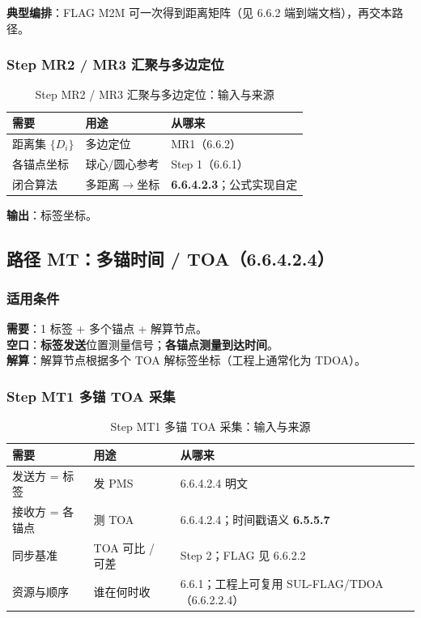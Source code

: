 \documentclass[11pt,a4paper]{ctexart}
\begin{document}
\textbf{典型编排}：FLAG M2M 可一次得到距离矩阵（见 6.6.2 端到端文档），再交本路径。

\subsubsection{Step MR2 / MR3 汇聚与多边定位}

\begin{longtable}{L{3.4cm}L{4.8cm}L{4.8cm}}
\caption{Step MR2 / MR3 汇聚与多边定位：输入与来源\label{tab:step134}} \\
\toprule
\textbf{需要} & \textbf{用途} & \textbf{从哪来} \\
\midrule
距离集 $\{D_i\}$ & 多边定位 & MR1（6.6.2） \\
各锚点坐标 & 球心/圆心参考 & Step 1（6.6.1） \\
闭合算法 & 多距离$\rightarrow$坐标 & \textbf{6.6.4.2.3}；公式实现自定 \\
\bottomrule
\end{longtable}

\textbf{输出}：标签坐标。

\subsection{路径 MT：多锚时间 / TOA（6.6.4.2.4）}
\label{sec:mt}

\subsubsection{适用条件}

\textbf{需要}：1 标签 + 多个锚点 + 解算节点。\\
\textbf{空口}：\textbf{标签发送}位置测量信号；\textbf{各锚点测量到达时间}。\\
\textbf{解算}：解算节点根据多个 TOA 解标签坐标（工程上通常化为 TDOA）。

\subsubsection{Step MT1 多锚 TOA 采集}

\begin{longtable}{L{3.4cm}L{4.8cm}L{4.8cm}}
\caption{Step MT1 多锚 TOA 采集：输入与来源\label{tab:step135}} \\
\toprule
\textbf{需要} & \textbf{用途} & \textbf{从哪来} \\
\midrule
发送方 = 标签 & 发 PMS & 6.6.4.2.4 明文 \\
接收方 = 各锚点 & 测 TOA & 6.6.4.2.4；时间戳语义 \textbf{6.5.5.7} \\
同步基准 & TOA 可比 / 可差 & Step 2；FLAG 见 6.6.2.2 \\
资源与顺序 & 谁在何时收 & 6.6.1；工程上可复用 SUL-FLAG/TDOA（6.6.2.2.4） \\
\bottomrule
\end{longtable}
\end{document}
